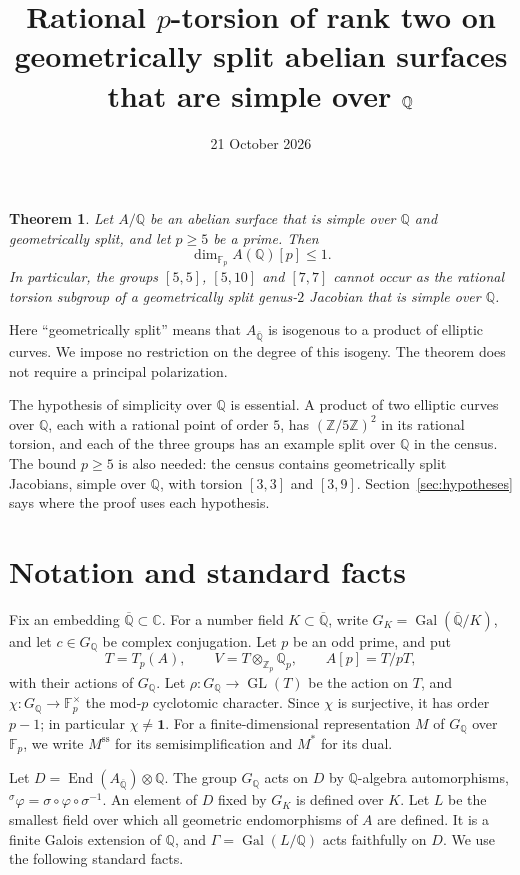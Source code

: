 \documentclass[11pt]{article}
\title{Rational \(p\)-torsion of rank two on geometrically split
abelian surfaces that are simple over \(\Q\)}
\author{}
\date{21 October 2026}
\newtheorem{theorem}{Theorem}
\newcommand{\Q}{\mathbb Q}
\newcommand{\Z}{\mathbb Z}
\newcommand{\F}{\mathbb F}
\newcommand{\C}{\mathbb C}
\DeclareMathOperator{\End}{End}
\DeclareMathOperator{\Gal}{Gal}
\DeclareMathOperator{\GL}{GL}
\begin{document}
\maketitle

\begin{theorem}\label{thm:main}
Let \(A/\Q\) be an abelian surface that is simple over \(\Q\) and
geometrically split, and let \(p\geq5\) be a prime. Then
\[
 \dim_{\F_p}A(\Q)[p]\leq1.
\]
In particular, the groups \([5,5]\), \([5,10]\) and \([7,7]\) cannot
occur as the rational torsion subgroup of a geometrically split
genus-\(2\) Jacobian that is simple over \(\Q\).
\end{theorem}

Here ``geometrically split'' means that \(A_{\overline{\Q}}\) is
isogenous to a product of elliptic curves. We impose no restriction on
the degree of this isogeny. The theorem does not require a principal
polarization.

The hypothesis of simplicity over \(\Q\) is essential. A product of two
elliptic curves over \(\Q\), each with a rational point of order \(5\),
has \((\Z/5\Z)^2\) in its rational torsion, and each of the three groups
has an example split over \(\Q\) in the census. The bound \(p\geq5\) is
also needed: the census contains geometrically split Jacobians, simple
over \(\Q\), with torsion \([3,3]\) and \([3,9]\).
Section~\ref{sec:hypotheses} says where the proof uses each hypothesis.

\section{Notation and standard facts}\label{sec:notation}

Fix an embedding \(\overline{\Q}\subset\C\). For a number field
\(K\subset\overline{\Q}\), write \(G_K=\Gal(\overline{\Q}/K)\), and let
\(c\in G_{\Q}\) be complex conjugation. Let \(p\) be an odd prime, and
put
\[
 T=T_p(A),\qquad V=T\otimes_{\Z_p}\Q_p,\qquad A[p]=T/pT,
\]
with their actions of \(G_{\Q}\). Let \(\rho:G_{\Q}\to\GL(T)\) be the
action on \(T\), and \(\chi:G_{\Q}\to\F_p^\times\) the mod-\(p\)
cyclotomic character. Since \(\chi\) is surjective, it has order
\(p-1\); in particular \(\chi\neq\mathbf 1\). For a finite-dimensional
representation \(M\) of \(G_{\Q}\) over \(\F_p\), we write
\(M^{\mathrm{ss}}\) for its semisimplification and \(M^*\) for its
dual.

Let \(D=\End(A_{\overline{\Q}})\otimes\Q\). The group \(G_{\Q}\) acts
on \(D\) by \(\Q\)-algebra automorphisms,
\({}^\sigma\varphi=\sigma\circ\varphi\circ\sigma^{-1}\). An element of
\(D\) fixed by \(G_K\) is defined over \(K\). Let \(L\) be the smallest
field over which all geometric endomorphisms of \(A\) are defined. It
is a finite Galois extension of \(\Q\), and \(\Gamma=\Gal(L/\Q)\) acts
faithfully on \(D\). We use the following standard facts.
\end{document}
